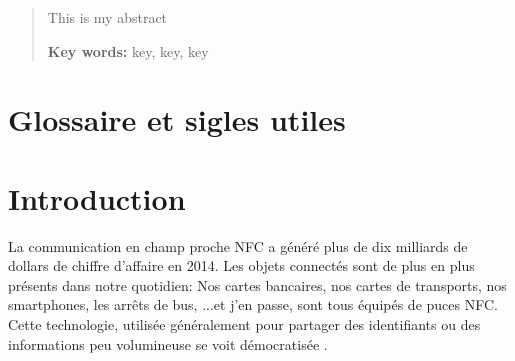 \documentclass{themeensg}
\begin{document}
\begin{abstract}
\thispagestyle{empty}
	\vspace{1cm}
	
	This is my abstract
	
	\vspace{1.5cm}
	
	\textbf{Key words:} key, key, key
\end{abstract}


\tableofcontents

\newevenpage
\listoffigures

\newevenpage
\listoftables

\chapter*{Glossaire et sigles utiles}

  \begin{acronym}
  \end{acronym}


\newevenpage
\chapter*{Introduction}
  
  \vspace{1.5cm}
  
	La communication en champ proche NFC a généré plus de dix milliards de dollars de chiffre d'affaire en 2014. Les objets connectés sont de plus en plus présents dans notre quotidien: Nos cartes bancaires, nos cartes de transports, nos smartphones, les arrêts de bus, ...et j'en passe, sont tous équipés de puces NFC. Cette technologie, utilisée généralement pour partager des identifiants ou des informations peu volumineuse se voit démocratisée .
\end{document}
